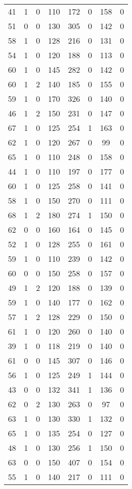 \documentclass{article}
\begin{document}
\begin{longtable}{*{8}{c}}
41 & 1 & 0 & 110 & 172 & 0 & 158 & 0 \\
51 & 0 & 0 & 130 & 305 & 0 & 142 & 0 \\
58 & 1 & 0 & 128 & 216 & 0 & 131 & 0 \\
54 & 1 & 0 & 120 & 188 & 0 & 113 & 0 \\
60 & 1 & 0 & 145 & 282 & 0 & 142 & 0 \\
60 & 1 & 2 & 140 & 185 & 0 & 155 & 0 \\
59 & 1 & 0 & 170 & 326 & 0 & 140 & 0 \\
46 & 1 & 2 & 150 & 231 & 0 & 147 & 0 \\
67 & 1 & 0 & 125 & 254 & 1 & 163 & 0 \\
62 & 1 & 0 & 120 & 267 & 0 & 99 & 0 \\
65 & 1 & 0 & 110 & 248 & 0 & 158 & 0 \\
44 & 1 & 0 & 110 & 197 & 0 & 177 & 0 \\
60 & 1 & 0 & 125 & 258 & 0 & 141 & 0 \\
58 & 1 & 0 & 150 & 270 & 0 & 111 & 0 \\
68 & 1 & 2 & 180 & 274 & 1 & 150 & 0 \\
62 & 0 & 0 & 160 & 164 & 0 & 145 & 0 \\
52 & 1 & 0 & 128 & 255 & 0 & 161 & 0 \\
59 & 1 & 0 & 110 & 239 & 0 & 142 & 0 \\
60 & 0 & 0 & 150 & 258 & 0 & 157 & 0 \\
49 & 1 & 2 & 120 & 188 & 0 & 139 & 0 \\
59 & 1 & 0 & 140 & 177 & 0 & 162 & 0 \\
57 & 1 & 2 & 128 & 229 & 0 & 150 & 0 \\
61 & 1 & 0 & 120 & 260 & 0 & 140 & 0 \\
39 & 1 & 0 & 118 & 219 & 0 & 140 & 0 \\
61 & 0 & 0 & 145 & 307 & 0 & 146 & 0 \\
56 & 1 & 0 & 125 & 249 & 1 & 144 & 0 \\
43 & 0 & 0 & 132 & 341 & 1 & 136 & 0 \\
62 & 0 & 2 & 130 & 263 & 0 & 97 & 0 \\
63 & 1 & 0 & 130 & 330 & 1 & 132 & 0 \\
65 & 1 & 0 & 135 & 254 & 0 & 127 & 0 \\
48 & 1 & 0 & 130 & 256 & 1 & 150 & 0 \\
63 & 0 & 0 & 150 & 407 & 0 & 154 & 0 \\
55 & 1 & 0 & 140 & 217 & 0 & 111 & 0 \\

\end{longtable}
\end{document}
